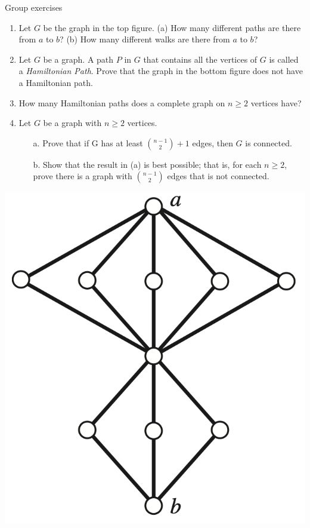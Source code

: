 \documentclass[10pt]{beamer}
\begin{document}
\begin{frame}{Group exercises}
\small 
\noindent
\begin{minipage}{0.6\textwidth}
\begin{enumerate}
	\item  Let $G$ be the graph in the top figure.   (a) How many different paths are there from $a$ to $b$? (b) How many different walks are there from $a$ to $b$?
	\item Let $G$ be a graph.  A path $P$ in $G$ that contains all the vertices of $G$ is called a \textit{Hamiltonian Path}.  Prove that the graph in the bottom figure does not have a Hamiltonian path.
    \item How many Hamiltonian paths does a complete graph on $n \geq 2$ vertices have?
    \item Let $G$ be a graph with $n \geq 2$ vertices.  
    \begin{itemize}
    \item[a.] Prove that if G has at least $\binom{n-1}{2} +1$ edges, then $G$ is connected.
    \item[b.] Show that the result in (a) is best possible; that is, for each $n \geq 2$, prove there is a graph with 	$\binom{n-1}{2}$ edges that is not connected.
    \end{itemize}

\end{enumerate}
\end{minipage}%
\hfill
\begin{minipage}{0.38\textwidth}
   
    \includegraphics[width=\textwidth]{images/connection_exercise_1} %
    

\end{minipage}
\end{frame}
\end{document}
